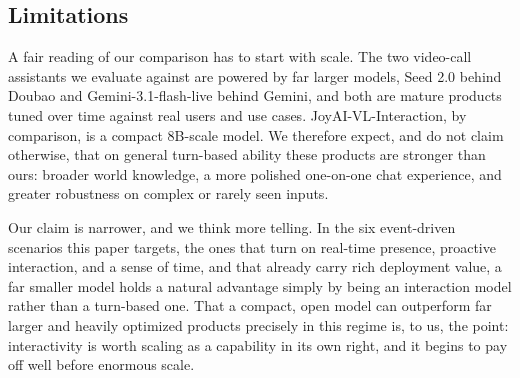 \documentclass{llmxive}
\begin{document}



\subsection{Limitations}\label{sec:limitations}
A fair reading of our comparison has to start with scale. The two video-call assistants we evaluate against are powered by far larger models, Seed 2.0 behind Doubao and Gemini-3.1-flash-live behind Gemini, and both are mature products tuned over time against real users and use cases. JoyAI-VL-Interaction, by comparison, is a compact 8B-scale model. We therefore expect, and do not claim otherwise, that on general turn-based ability these products are stronger than ours: broader world knowledge, a more polished one-on-one chat experience, and greater robustness on complex or rarely seen inputs.

Our claim is narrower, and we think more telling. In the six event-driven scenarios this paper targets, the ones that turn on real-time presence, proactive interaction, and a sense of time, and that already carry rich deployment value, a far smaller model holds a natural advantage simply by being an interaction model rather than a turn-based one. That a compact, open model can outperform far larger and heavily optimized products precisely in this regime is, to us, the point: interactivity is worth scaling as a capability in its own right, and it begins to pay off well before enormous scale.

\end{document}
